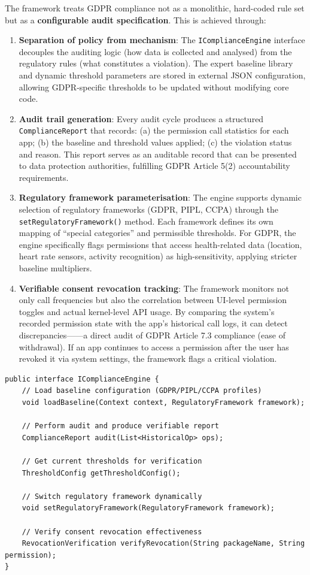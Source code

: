 The framework treats GDPR compliance not as a monolithic, hard-coded rule set but as a \textbf{configurable audit specification}. This is achieved through:

\begin{enumerate}
\item \textbf{Separation of policy from mechanism}: The \texttt{IComplianceEngine} interface decouples the auditing logic (how data is collected and analysed) from the regulatory rules (what constitutes a violation). The expert baseline library and dynamic threshold parameters are stored in external JSON configuration, allowing GDPR-specific thresholds to be updated without modifying core code.
\item \textbf{Audit trail generation}: Every audit cycle produces a structured \texttt{ComplianceReport} that records: (a) the permission call statistics for each app; (b) the baseline and threshold values applied; (c) the violation status and reason. This report serves as an auditable record that can be presented to data protection authorities, fulfilling GDPR Article 5(2) accountability requirements.
\item \textbf{Regulatory framework parameterisation}: The engine supports dynamic selection of regulatory frameworks (GDPR, PIPL, CCPA) through the \texttt{setRegulatoryFramework()} method. Each framework defines its own mapping of ``special categories'' and permissible thresholds. For GDPR, the engine specifically flags permissions that access health-related data (location, heart rate sensors, activity recognition) as high-sensitivity, applying stricter baseline multipliers.
\item \textbf{Verifiable consent revocation tracking}: The framework monitors not only call frequencies but also the correlation between UI-level permission toggles and actual kernel-level API usage. By comparing the system's recorded permission state with the app's historical call logs, it can detect discrepancies——a direct audit of GDPR Article 7.3 compliance (ease of withdrawal). If an app continues to access a permission after the user has revoked it via system settings, the framework flags a critical violation.
\end{enumerate}

\begin{lstlisting}[caption=IComplianceEngine core interface with regulatory audit support]
public interface IComplianceEngine {
    // Load baseline configuration (GDPR/PIPL/CCPA profiles)
    void loadBaseline(Context context, RegulatoryFramework framework);
    
    // Perform audit and produce verifiable report
    ComplianceReport audit(List<HistoricalOp> ops);
    
    // Get current thresholds for verification
    ThresholdConfig getThresholdConfig();
    
    // Switch regulatory framework dynamically
    void setRegulatoryFramework(RegulatoryFramework framework);
    
    // Verify consent revocation effectiveness
    RevocationVerification verifyRevocation(String packageName, String permission);
}
\end{lstlisting}

